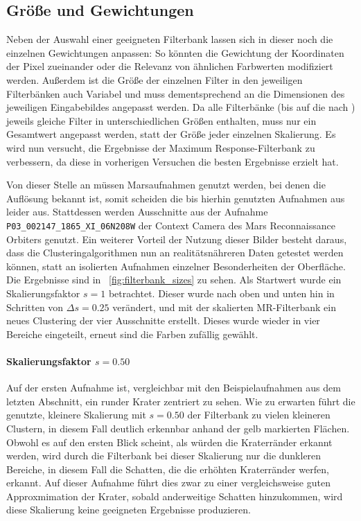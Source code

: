 \subsection{Größe und Gewichtungen}

Neben der Auswahl einer geeigneten Filterbank lassen sich in dieser noch die einzelnen Gewichtungen anpassen: So könnten \zB die Gewichtung der Koordinaten der Pixel zueinander oder die Relevanz von ähnlichen Farbwerten modifiziert werden. Außerdem ist die Größe der einzelnen Filter in den jeweiligen Filterbänken auch Variabel und muss dementsprechend an die Dimensionen des jeweiligen Eingabebildes angepasst werden. Da alle Filterbänke (bis auf die nach \cite{jain_91}) jeweils gleiche Filter in unterschiedlichen Größen enthalten, muss nur ein Gesamtwert angepasst werden, statt der Größe jeder einzelnen Skalierung. Es wird nun versucht, die Ergebnisse der Maximum Response-Filterbank zu verbessern, da diese in vorherigen Versuchen die besten Ergebnisse erzielt hat.

Von dieser Stelle an müssen Marsaufnahmen genutzt werden, bei denen die Auflösung bekannt ist, somit scheiden die bis hierhin genutzten Aufnahmen aus \cite{greeley_13} leider aus. Stattdessen werden Ausschnitte aus der Aufnahme \texttt{P03\_002147\_1865\_XI\_06N208W} der Context Camera des Mars Reconnaissance Orbiters genutzt. Ein weiterer Vorteil der Nutzung dieser Bilder besteht daraus, dass die Clusteringalgorithmen nun an realitätsnähreren Daten getestet werden können, statt an isolierten Aufnahmen einzelner Besonderheiten der Oberfläche. Die Ergebnisse sind in \figurename~\ref{fig:filterbank_sizes} zu sehen. Als Startwert wurde ein Skalierungsfaktor $s=1$ betrachtet. Dieser wurde nach oben und unten hin in Schritten von $\Delta s=0.25$ verändert, und mit der skalierten MR-Filterbank ein neues Clustering der vier Ausschnitte erstellt. Dieses wurde wieder in vier Bereiche eingeteilt, erneut sind die Farben zufällig gewählt.

\paragraph{Skalierungsfaktor $s=0.50$}

Auf der ersten Aufnahme ist, vergleichbar mit den Beispielaufnahmen aus dem letzten Abschnitt, ein runder Krater zentriert zu sehen. Wie zu erwarten führt die genutzte, kleinere Skalierung mit $s=0.50$ der Filterbank zu vielen kleineren Clustern, in diesem Fall deutlich erkennbar anhand der gelb markierten Flächen. Obwohl es auf den ersten Blick scheint, als würden die Kraterränder erkannt werden, wird durch die Filterbank bei dieser Skalierung nur die dunkleren Bereiche, in diesem Fall die Schatten, die die erhöhten Kraterränder werfen, erkannt. Auf dieser Aufnahme führt dies zwar zu einer vergleichsweise guten Approxmimation der Krater, sobald anderweitige Schatten hinzukommen, wird diese Skalierung keine geeigneten Ergebnisse produzieren.


